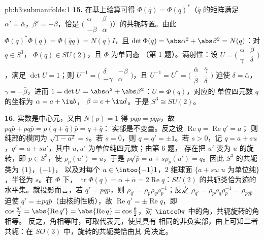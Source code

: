 \begin{solution}{pb:b3:submanifolds:1}
\textbf{15.} 在基上验算可得 $\Phi(\bar q) =
\Phi(q)^*$（$\bar q$ 的矩阵满足 $\alpha' =
\bar\alpha$，$\beta' = -\beta$，恰是
$\bigl(\begin{smallmatrix}\alpha & \beta\\
-\bar\beta & \bar\alpha\end{smallmatrix}\bigr)$）的共轭转置。由此
$\Phi(q)^*\Phi(q) = \Phi(\bar qq) = N(q)I$，且 $\det\Phi(q)
= \abs\alpha^2 + \abs\beta^2 = N(q)$：对 $q \in S^3$，
$\Phi(q) \in SU(2)$，且 $\Phi$ 为单同态
（第 1 题）。满射性：设 $U =
\bigl(\begin{smallmatrix}\alpha & \beta\\ \gamma &
\delta\end{smallmatrix}\bigr)$，满足 $\det U = 1$；则
$U^{-1} = \bigl(\begin{smallmatrix}\delta & -\beta\\
-\gamma & \alpha\end{smallmatrix}\bigr)$，且 $U^{-1} = U^*
= \bigl(\begin{smallmatrix}\bar\alpha & \bar\gamma\\
\bar\beta & \bar\delta\end{smallmatrix}\bigr)$ 迫使
$\delta = \bar\alpha$，$\gamma = -\bar\beta$，进而 $1 =
\det U = \abs\alpha^2 + \abs\beta^2$：$U = \Phi(q)$，对应的
单位四元数 $q$ 的坐标为 $\alpha = a + \iu b$，
$\beta = c + \iu d$。于是 $S^3 \cong SU(2)$。

\textbf{16.} 实数是中心元，又由 $N(p) = 1$ 得
$\overline{pq\bar p} = p\bar q\bar p$，故 $pq\bar p +
\overline{pq\bar p} = p(q + \bar q)\bar p = q + \bar q$：
实部是不变量。反之设
$\operatorname{Re}q = \operatorname{Re}q' = a$；
则纯部的模同为 $\sqrt{1 - a^2} = s$。若 $s =
0$，则 $q = q' = \pm1$。若 $s > 0$，记 $q = a + su$，$q' =
a + su'$，其中 $u, u'$ 为单位纯四元数；由第 6 题，
存在把 $u'$ 变为 $u$ 的旋转，即 $p \in S^3$，使
$\rho_p(u') = u$，于是 $pq'\bar p = a + s\rho_p(u') =
q$。因此 $S^3$ 的共轭类为 $\{1\}$，$\{-1\}$，
以及对每个 $a \in \intoo{-1}1$，$2$ 维球面 $\{a + su :
u \text{ 为单位纯}\}$，半径为 $s$。在 $\Phi$ 下，
$\operatorname{tr}\Phi(q) = \alpha + \bar\alpha =
2\operatorname{Re}q$：$SU(2)$ 的共轭类恰为迹的
水平集。就投影而言，若 $q' = pq\bar p$，则
$\rho_{q'} = \rho_p\rho_q\rho_p^{-1}$；反之
$\rho_{q'} = \rho_p\rho_q\rho_p^{-1} = \rho_{pq\bar p}$
迫使 $q' = \pm pq\bar p$（由核的性质），故
$\operatorname{Re}q' = \pm\operatorname{Re}q$，即
$\cos\frac{\theta'}2 = \abs{\operatorname{Re}q'} =
\abs{\operatorname{Re}q} = \cos\frac\theta2$，对
$\intcc0\pi$ 中的角，共轭旋转的角相等。
反之，角相等时，可取代表元，使其具有
相同的非负实部，由上可知二者共轭：在
$SO(3)$ 中，旋转的共轭类恰由其
角决定。


\end{solution}
